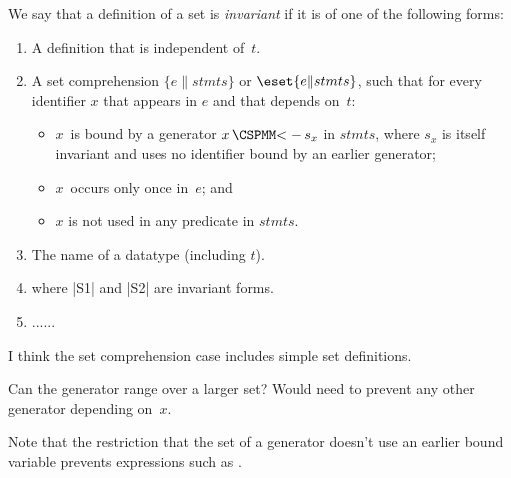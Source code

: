 \begin{definition}
\label{def:invariant}
We say that a definition of a set is \emph{invariant} if it is of one of the
following forms:
%
\begin{enumerate}
\item A definition that is independent of~$t$.

\item A set comprehension $\{e \| stmts\}$ or $\eset{e \| stmts}$, such  that
for every identifier $x$ that appears in $e$ and that depends on~$t$:
  \begin{itemize}
  \item $x$~is bound by a generator $x \,\M{<-}\, s_x$ in $stmts$, where $s_x$ is
  itself invariant and uses no identifier bound by an earlier generator;
  \item $x$~occurs only once in~$e$; and
  \item $x$ is not used in any predicate in $stmts$.
  \end{itemize}

\item The name of a datatype (including $t$). 

\item {} where |S1| and |S2| are invariant forms. 

\item ......
\end{enumerate}
\end{definition}

I think the set comprehension case includes simple set definitions.

Can the generator range over a larger set?  Would need to prevent any other
generator depending on~$x$. 

Note that the restriction that the set of a generator doesn't use an earlier
bound variable prevents expressions such as 
. 




